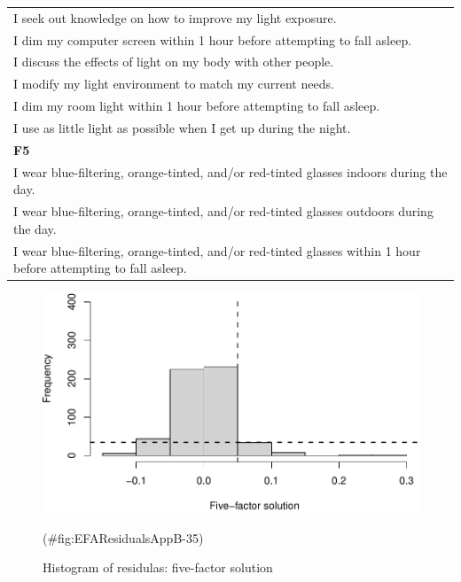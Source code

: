 \begin{appendix}
\begin{longtable}[]{@{}
  >{\raggedright\arraybackslash}p{}@{}}
I seek out knowledge on how to improve my light exposure. \\
I dim my computer screen within 1 hour before attempting to fall
asleep. \\
I discuss the effects of light on my body with other people. \\
I modify my light environment to match my current needs. \\
I dim my room light within 1 hour before attempting to fall asleep. \\
I use as little light as possible when I get up during the night. \\
\textbf{F5} \\
I wear blue-filtering, orange-tinted, and/or red-tinted glasses indoors
during the day. \\
I wear blue-filtering, orange-tinted, and/or red-tinted glasses outdoors
during the day. \\
I wear blue-filtering, orange-tinted, and/or red-tinted glasses within 1
hour before attempting to fall asleep. \\
\bottomrule
\end{longtable}

\begin{figure}

{\centering \includegraphics[width=0.5\linewidth,height=0.5\textheight]{manuscript_files/figure-latex/EFAResidualsAppB-35-1} 

}

\caption{ Histogram of residulas:  five-factor solution}(\#fig:EFAResidualsAppB-35)
\end{figure}
\end{appendix}
